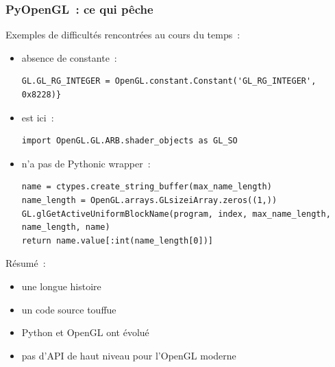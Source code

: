 \begin{frame}[fragile]
  \frametitle{PyOpenGL~: ce qui pêche}
  Exemples de difficultés rencontrées au cours du temps~:
    \begin{itemize}
    \item absence de constante~:%
      {\tiny\begin{verbatim}GL.GL_RG_INTEGER = OpenGL.constant.Constant('GL_RG_INTEGER', 0x8228)}\end{verbatim}}
    \item {} est ici~:%
      {\tiny\begin{verbatim}import OpenGL.GL.ARB.shader_objects as GL_SO\end{verbatim}}
    \item {} n'a pas de Pythonic wrapper~:
{\tiny%
\begin{verbatim}
name = ctypes.create_string_buffer(max_name_length)
name_length = OpenGL.arrays.GLsizeiArray.zeros((1,))
GL.glGetActiveUniformBlockName(program, index, max_name_length, name_length, name)
return name.value[:int(name_length[0])]
\end{verbatim}}
    \end{itemize}
    \vspace{1em}
    Résumé~:
    \begin{itemize}
    \item une longue histoire
    \item un code source touffue
    \item Python et OpenGL ont évolué
    \item pas d'API de haut niveau pour l'OpenGL moderne %
    \end{itemize}
\end{frame}

